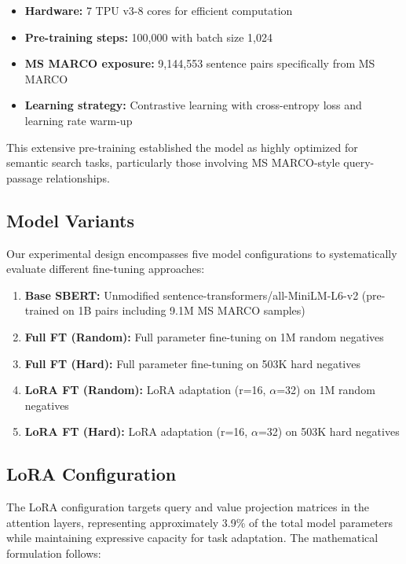 \begin{itemize}
\item \textbf{Hardware:} 7 TPU v3-8 cores for efficient computation
\item \textbf{Pre-training steps:} 100,000 with batch size 1,024
\item \textbf{MS MARCO exposure:} 9,144,553 sentence pairs specifically from MS MARCO
\item \textbf{Learning strategy:} Contrastive learning \cite{gao2021simcse} with cross-entropy loss and learning rate warm-up
\end{itemize}

This extensive pre-training established the model as highly optimized for semantic search tasks, particularly those involving MS MARCO-style query-passage relationships.

\subsection{Model Variants}

Our experimental design encompasses five model configurations to systematically evaluate different fine-tuning approaches:

\begin{enumerate}
\item \textbf{Base SBERT:} Unmodified sentence-transformers/all-MiniLM-L6-v2 (pre-trained on 1B pairs including 9.1M MS MARCO samples)
\item \textbf{Full FT (Random):} Full parameter fine-tuning on 1M random negatives
\item \textbf{Full FT (Hard):} Full parameter fine-tuning on 503K hard negatives
\item \textbf{LoRA FT (Random):} LoRA adaptation (r=16, $\alpha$=32) on 1M random negatives  
\item \textbf{LoRA FT (Hard):} LoRA adaptation (r=16, $\alpha$=32) on 503K hard negatives
\end{enumerate}

\subsection{LoRA Configuration}

The LoRA configuration targets query and value projection matrices in the attention layers, representing approximately 3.9\% of the total model parameters while maintaining expressive capacity for task adaptation. The mathematical formulation follows:

